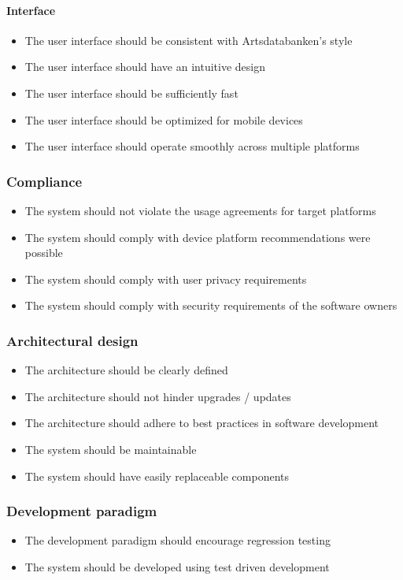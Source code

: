     \paragraph{Interface}
        \begin{itemize}
            \item The user interface should be consistent with Artsdatabanken's style
            \item The user interface should have an intuitive design
            \item The user interface should be sufficiently fast
            \item The user interface should be optimized for mobile devices
            \item The user interface should operate smoothly across multiple platforms
        \end{itemize}

\subsubsection{Compliance}
		\begin{itemize}
		     \item The system should not violate the usage agreements for target platforms
             \item The system should comply with device platform recommendations were possible
             \item The system should comply with user privacy requirements
             \item The system should comply with security requirements of the software owners
	    \end{itemize}

\subsubsection{Architectural design}
    \begin{itemize}
		\item The architecture should be clearly defined
		\item The architecture should not hinder upgrades / updates 
		\item The architecture should adhere to best practices in software development
        \item The system should be maintainable
        \item The system should have easily replaceable components
    \end{itemize}

\subsubsection{Development paradigm}
    \begin{itemize}
		\item The development paradigm should encourage regression testing
		\item The system should be developed using test driven development
    \end{itemize}
